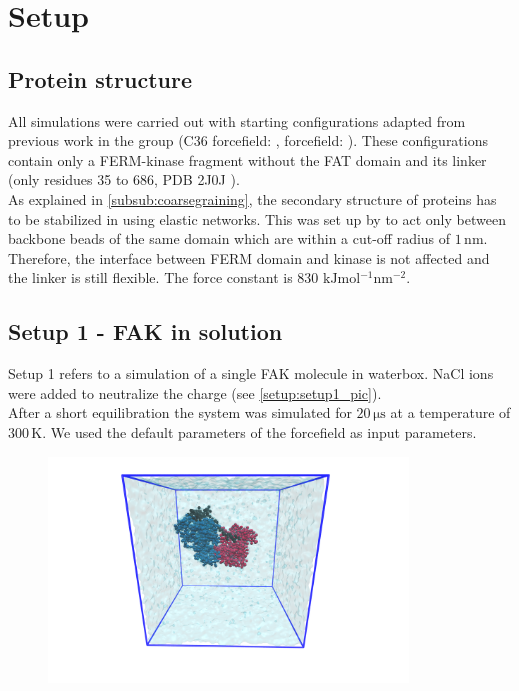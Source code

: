 \chapter{Setup}
\section{Protein structure}
All simulations were carried out with starting configurations adapted from previous work in the group (C36 forcefield: \textcite{pap003}, \martini{} forcefield: \textcite{sara}). These configurations contain only a FERM-kinase fragment without the FAT domain and its linker (only residues 35 to 686, PDB 2J0J \autocite{structFAK}).\\
As explained in \autoref{subsub:coarsegraining}, the secondary structure of proteins has to be stabilized in \martini{} using elastic networks. This was set up by \textcite{sara} to act only between backbone beads of the same domain which are within a cut-off radius of $1\,\si{\nano\metre}$. Therefore, the interface between FERM domain and kinase is not affected and the linker is still flexible. The force constant is 830 $\si{\kilo\joule\mole^{-1}\nano\meter^{-2}}$. 
\section{Setup 1 - FAK in solution}
\label{setup:setup1}
Setup 1 refers to a \martini{} simulation of a single FAK molecule in waterbox. NaCl ions were added to neutralize the charge (see \autoref{setup:setup1_pic}).\\
After a short equilibration the system was simulated for $20\,\si{\micro\second}$ at a temperature of $300\,\si{\kelvin}$. We used the default parameters of the \martini{} forcefield as input parameters.
%
%
%
\begin{figure}[h]
	\centering
	\includegraphics[height=6cm]{figures/setup/setup_free}
	\label{setup:setup1_pic}
\end{figure}
%
%
%
